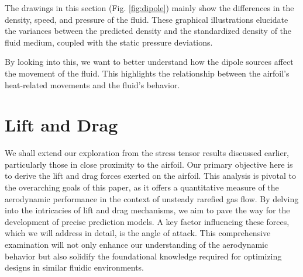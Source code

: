 The drawings in this section (Fig. \ref{fig:dipole}) mainly show the differences in the density, speed, and pressure of the fluid. These graphical illustrations elucidate the variances between the predicted density and the standardized density of the fluid medium, coupled with the static pressure deviations.

By looking into this, we want to better understand how the dipole sources affect the movement of the fluid. This highlights the relationship between the airfoil's heat-related movements and the fluid's behavior.

\section{Lift and Drag}
We shall extend our exploration from the stress tensor results discussed earlier, particularly those in close proximity to the airfoil. Our primary objective here is to derive the lift and drag forces exerted on the airfoil. This analysis is pivotal to the overarching goals of this paper, as it offers a quantitative measure of the aerodynamic performance in the context of unsteady rarefied gas flow. By delving into the intricacies of lift and drag mechanisms, we aim to pave the way for the development of precise prediction models. A key factor influencing these forces, which we will address in detail, is the angle of attack. This comprehensive examination will not only enhance our understanding of the aerodynamic behavior but also solidify the foundational knowledge required for optimizing designs in similar fluidic environments.

